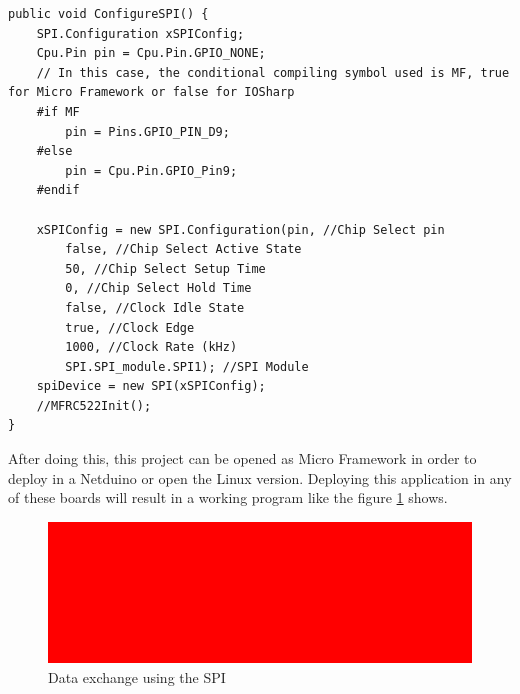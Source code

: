 \begin{lstlisting}[language=CSharp, caption={SPIApi.cs - Conditional compiling symbol for NETMF and IOSharp}]
public void ConfigureSPI() {
    SPI.Configuration xSPIConfig;
    Cpu.Pin pin = Cpu.Pin.GPIO_NONE;
  	// In this case, the conditional compiling symbol used is MF, true for Micro Framework or false for IOSharp
  	#if MF
    	pin = Pins.GPIO_PIN_D9;
    #else
        pin = Cpu.Pin.GPIO_Pin9;
    #endif

    xSPIConfig = new SPI.Configuration(pin, //Chip Select pin
        false, //Chip Select Active State
        50, //Chip Select Setup Time
        0, //Chip Select Hold Time
        false, //Clock Idle State
        true, //Clock Edge
        1000, //Clock Rate (kHz)
        SPI.SPI_module.SPI1); //SPI Module
    spiDevice = new SPI(xSPIConfig);
    //MFRC522Init();
}
\end{lstlisting}

After doing this, this project can be opened as Micro Framework in order to deploy in a Netduino or open the Linux version. Deploying this application in any of these boards will result in a working program like the figure \ref{fig:IOEx-SPI} shows.
\begin{figure}[H]\begin{center}
 \centering
  \captionsetup{justification=centering}
  \includegraphics[width=1\textwidth]{pictures/sample/red}
  \caption{Data exchange using the SPI\label{fig:IOEx-SPI}}
\end{center}\end{figure}

